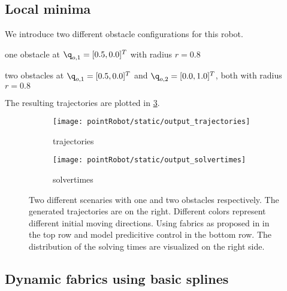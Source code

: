 \subsection{Local minima}%
\label{sub:local_minima}

We introduce two different obstacle configurations for this robot.
\begin{compactitem}
  \item one obstacle at $\q_{o,1} = [0.5, 0.0]^T$ with radius $r=0.8$
  \item two obstacles at $\q_{o,1} = [0.5, 0.0]^T$ and
          $\q_{o,2} = [0.0, 1.0]^T$, both with radius $r=0.8$
\end{compactitem}
The resulting trajectories are plotted in \cref{fig:pointRobot_static}.
\begin{figure}
  \begin{subfigure}[]{0.5\textwidth}
  \begin{center}
    \texttt{[image: pointRobot/static/output\_trajectories]}
  \end{center}
  \caption{trajectories}
  \label{fig:pointRobot_static_trajectories}
  \end{subfigure}%
  \begin{subfigure}[]{0.5\textwidth}
  \begin{center}
    \texttt{[image: pointRobot/static/output\_solvertimes]}
  \end{center}
  \caption{solvertimes}
  \label{fig:pointRobot_static_solvertimes}
  \end{subfigure}
  \caption{Two different scenaries with one and two obstacles respectively. The generated
trajectories are on the right. Different colors represent different initial moving
directions. Using fabrics as proposed in \cite{Ratliff2020} in the top row and model
predicitive control in the bottom row. The distribution of the solving times are
visualized on the right side.}%
  \label{fig:pointRobot_static}
\end{figure}

\subsection{Dynamic fabrics using basic splines}

